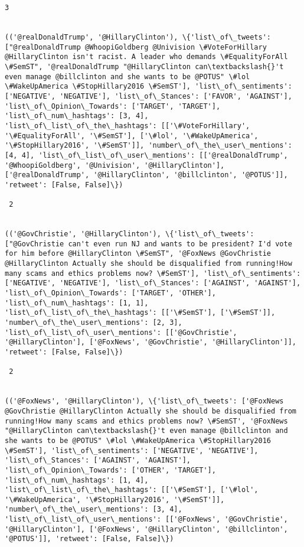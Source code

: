 \documentclass[11pt]{article}
\begin{document}
\begin{Verbatim}[commandchars=\\\{\}]
 3
 

(('@realDonaldTrump', '@HillaryClinton'), \{'list\_of\_tweets': ["@realDonaldTrump @WhoopiGoldberg @Univision \#VoteForHillary @HillaryClinton isn't racist. A leader who demands \#EqualityForAll \#SemST", '@realDonaldTrump "@HillaryClinton can\textbackslash{}'t even manage @billclinton and she wants to be @POTUS" \#lol \#WakeUpAmerica \#StopHillary2016 \#SemST'], 'list\_of\_sentiments': ['NEGATIVE', 'NEGATIVE'], 'list\_of\_Stances': ['FAVOR', 'AGAINST'], 'list\_of\_Opinion\_Towards': ['TARGET', 'TARGET'], 'list\_of\_num\_hashtags': [3, 4], 'list\_of\_list\_of\_the\_hashtags': [['\#VoteForHillary', '\#EqualityForAll', '\#SemST'], ['\#lol', '\#WakeUpAmerica', '\#StopHillary2016', '\#SemST']], 'number\_of\_the\_user\_mentions': [4, 4], 'list\_of\_list\_of\_user\_mentions': [['@realDonaldTrump', '@WhoopiGoldberg', '@Univision', '@HillaryClinton'], ['@realDonaldTrump', '@HillaryClinton', '@billclinton', '@POTUS']], 'retweet': [False, False]\})

 2
 

(('@GovChristie', '@HillaryClinton'), \{'list\_of\_tweets': ["@GovChristie can't even run NJ and wants to be president? I'd vote for him before @HillaryClinton \#SemST", '@FoxNews @GovChristie @HillaryClinton Actually she should be disqualified from running!How many scams and ethics problems now? \#SemST'], 'list\_of\_sentiments': ['NEGATIVE', 'NEGATIVE'], 'list\_of\_Stances': ['AGAINST', 'AGAINST'], 'list\_of\_Opinion\_Towards': ['TARGET', 'OTHER'], 'list\_of\_num\_hashtags': [1, 1], 'list\_of\_list\_of\_the\_hashtags': [['\#SemST'], ['\#SemST']], 'number\_of\_the\_user\_mentions': [2, 3], 'list\_of\_list\_of\_user\_mentions': [['@GovChristie', '@HillaryClinton'], ['@FoxNews', '@GovChristie', '@HillaryClinton']], 'retweet': [False, False]\})

 2
 

(('@FoxNews', '@HillaryClinton'), \{'list\_of\_tweets': ['@FoxNews @GovChristie @HillaryClinton Actually she should be disqualified from running!How many scams and ethics problems now? \#SemST', '@FoxNews  "@HillaryClinton can\textbackslash{}'t even manage @billclinton and she wants to be @POTUS" \#lol \#WakeUpAmerica \#StopHillary2016 \#SemST'], 'list\_of\_sentiments': ['NEGATIVE', 'NEGATIVE'], 'list\_of\_Stances': ['AGAINST', 'AGAINST'], 'list\_of\_Opinion\_Towards': ['OTHER', 'TARGET'], 'list\_of\_num\_hashtags': [1, 4], 'list\_of\_list\_of\_the\_hashtags': [['\#SemST'], ['\#lol', '\#WakeUpAmerica', '\#StopHillary2016', '\#SemST']], 'number\_of\_the\_user\_mentions': [3, 4], 'list\_of\_list\_of\_user\_mentions': [['@FoxNews', '@GovChristie', '@HillaryClinton'], ['@FoxNews', '@HillaryClinton', '@billclinton', '@POTUS']], 'retweet': [False, False]\})


\end{Verbatim}
\end{document}
